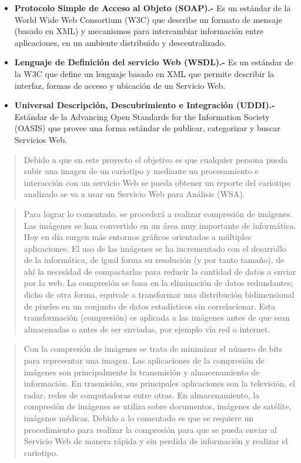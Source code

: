 \documentclass[12pt,letterpaper,titlepage]{article}
\begin{document}
\begin{itemize}\itemsep=0pt
\item  \textbf{Protocolo Simple de Acceso al Objeto (SOAP).-} Es un estándar de la World Wide Web Consortium (W3C) que describe un formato de mensaje (basado en XML) y mecanismos para intercambiar información entre aplicaciones, en un ambiente distribuido y descentralizado.
\item  \textbf{Lenguaje de Definición del servicio Web (WSDL).-} Es un estándar de la W3C que define un lenguaje basado en XML que permite describir la interfaz, formas de acceso y ubicación de un Servicio Web.
\item  \textbf{Universal Descripción, Descubrimiento e Integración (UDDI).-} Estándar de la
Advancing Open Standards for the Information Society (OASIS) que provee una forma estándar de publicar, categorizar y buscar Servicios Web.
\end{itemize}

\begin{quotation}
Debido a que en este proyecto el objetivo es que cualquier persona pueda subir una imagen de un cariotipo y mediante un procesamiento e interacción con un servicio Web se pueda obtener un reporte del cariotipo analizado se va a usar un Servicio Web para Análisis (WSA).\\
\end{quotation}

\begin{quotation}
Para lograr lo comentado, se procederá a realizar compresión de imágenes. Las imágenes se han convertido en un área muy importante de informática. Hoy en día surgen más entornos gráficos orientados a múltiples aplicaciones. El uso de las imágenes se ha incrementado con el desarrollo de la informática, de igual forma su resolución (y por tanto tamaño), de ahí la necesidad de compactarlas para reducir la cantidad de datos a enviar por la web. La compresión se basa en la eliminación de datos redundantes; dicho de otra forma, equivale a transformar una distribución bidimensional de pixeles en un conjunto de datos estadísticos sin correlacionar. Esta transformación (compresión) es aplicada a las imágenes antes de que sean almacenadas o antes de ser enviadas, por ejemplo vía red o internet. %
\end{quotation}

\begin{quotation}
Con la compresión de imágenes se trata de minimizar el número de bits para representar una imagen. Las aplicaciones de la compresión de imágenes son principalmente la transmisión y almacenamiento de información. En trasmisión, sus principales aplicaciones son la televisión, el radar, redes de computadoras entre otras. En almacenamiento, la compresión de imágenes se utiliza sobre documentos, imágenes de satélite, imágenes médicas. Debido a lo comentado es que se requiere un procedimiento para realizar la compresión para que se pueda enviar al Servicio Web de manera rápida y sin perdida de información y realizar el cariotipo. %
\end{quotation}
\end{document}

